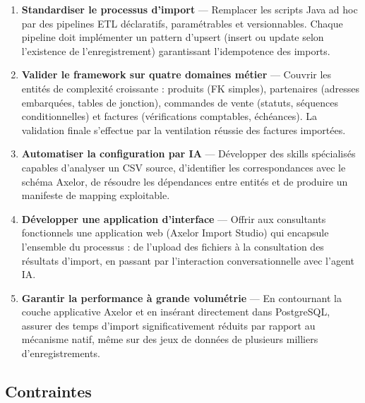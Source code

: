 \begin{enumerate}
    \item \textbf{Standardiser le processus d'import} — Remplacer les scripts Java ad hoc par des pipelines ETL déclaratifs, paramétrables et versionnables. Chaque pipeline doit implémenter un pattern d'upsert (insert ou update selon l'existence de l'enregistrement) garantissant l'idempotence des imports.

    \item \textbf{Valider le framework sur quatre domaines métier} — Couvrir les entités de complexité croissante : produits (FK simples), partenaires (adresses embarquées, tables de jonction), commandes de vente (statuts, séquences conditionnelles) et factures (vérifications comptables, échéances). La validation finale s'effectue par la ventilation réussie des factures importées.

    \item \textbf{Automatiser la configuration par IA} — Développer des skills spécialisés capables d'analyser un CSV source, d'identifier les correspondances avec le schéma Axelor, de résoudre les dépendances entre entités et de produire un manifeste de mapping exploitable.

    \item \textbf{Développer une application d'interface} — Offrir aux consultants fonctionnels une application web (Axelor Import Studio) qui encapsule l'ensemble du processus : de l'upload des fichiers à la consultation des résultats d'import, en passant par l'interaction conversationnelle avec l'agent IA.

    \item \textbf{Garantir la performance à grande volumétrie} — En contournant la couche applicative Axelor et en insérant directement dans PostgreSQL, assurer des temps d'import significativement réduits par rapport au mécanisme natif, même sur des jeux de données de plusieurs milliers d'enregistrements.
\end{enumerate}

\subsection{Contraintes}

